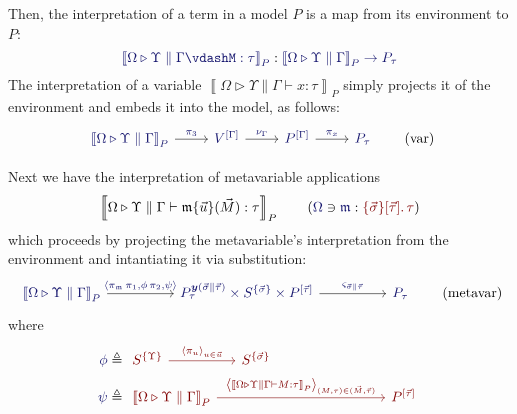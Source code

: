 \documentclass[11pt]{article}
\theoremstyle{definition}
\theoremstyle{remark}
\numberwithin{equation}{section}
\def\IModeColorName{MidnightBlue}
\def\OModeColorName{Maroon}
\newcommand\IMode[1]{{\color{\IModeColorName}{#1}}}
\newcommand\OMode[1]{{\color{\OModeColorName}{#1}}}
\newcommand\Of[2]{\IMode{#1}: \IMode{#2}}
\newcommand\MkValence[3]{%
  \ifthenelse{\equal{#1}{}}{}{%
    \{#1\}%
  }%
  \ifthenelse{\equal{#2}{}}{}{%
    [#2]%
  }.\, #3%
}
\newcommand\Lookup[3]{\IMode{#1}\ni\IMode{#2}:\OMode{#3}}
\newcommand\Tuple[1]{\left\langle#1 \right\rangle}
\newcommand\MV[1]{\mathfrak{#1}}
\newcommand\MApp[3]{#1\{#2\}(#3)}
\newcommand\ADefine[2]{\IMode{#1}&\triangleq\OMode{#2}}
\newcommand\SemBrackets[1]{\left\llbracket#1\right\rrbracket}
\newcommand\Yoneda[1]{\boldsymbol{y} (#1)}
\begin{document}
Then, the interpretation of a term in a model $P$ is a map from its environment
to $P$:
\[%
  \Of{\SemBrackets{\Omega\triangleright\Upsilon\parallel\Gamma\vdash%
      M:\tau}_P}{\SemBrackets{\Omega\triangleright\Upsilon\parallel\Gamma}_P\to P_\tau}%
\]%
The interpretation of a variable
$\SemBrackets{\Omega\triangleright\Upsilon\parallel\Gamma\vdash x:\tau}_P$ simply
projects it of the environment and embeds it into the model, as follows:
\[
  \begin{tikzcd}[ampersand replacement = \&]
    {\IMode{\SemBrackets{\Omega\triangleright\Upsilon\parallel\Gamma}_P}} \arrow[r, "\IMode{\pi_3}"]
    \& {\IMode{V^{[\Gamma]}}} \arrow[r, "\IMode{\nu_{\Gamma}}"]
    \& {\IMode{P^{[\Gamma]}}} \arrow[r, "\IMode{\pi_x}"]
    \& \IMode{P_\tau}
  \end{tikzcd}
  \tag{var}
\]

Next we have the interpretation of metavariable applications
\[%
  \SemBrackets{\Omega\triangleright\Upsilon\parallel\Gamma\vdash%
    \MApp{\MV{m}}{\vec{u}}{\vec{M}} : \tau}_P%
  \qquad(\Lookup{\Omega}{\MV{m}}{\MkValence{\vec{\sigma}}{\vec{\tau}}{\tau}})
\]
which proceeds by projecting the metavariable's interpretation from the
environment and intantiating it via substitution:
\[
  \begin{tikzcd}[ampersand replacement = \&, sep=huge]
    {\IMode{\SemBrackets{\Omega\triangleright\Upsilon\parallel\Gamma}_P}}
          \arrow[r, "\IMode{\Tuple{\pi_\MV{m}\,\pi_1, \phi\,\pi_2, \psi}}"]
    \& {\IMode{P_{\tau}^{\Yoneda{\vec{\sigma}\parallel\vec{\tau}}}\times S^{\{\vec{\sigma}\}} \times P^{[\vec{\tau}]}}}
          \arrow[r, "\IMode{\varsigma_{\vec{\sigma}\parallel\vec{\tau}}}"]
    \& \IMode{P_\tau}
  \end{tikzcd}
  \tag{metavar}
\]
where
\begin{align*}
  \ADefine{\phi}{
  \begin{tikzcd}[ampersand replacement = \&, sep=huge]
    {S^{\{\Upsilon\}}} \arrow[r, "\Tuple{\pi_u}_{u\in\vec{u}}"]
    \& {S^{\{\vec{\sigma}\}}}
  \end{tikzcd}
  }\\
  \ADefine{\psi}{
   \begin{tikzcd}[ampersand replacement = \&, sep=28ex]
     {\SemBrackets{\Omega\triangleright\Upsilon\parallel\Gamma}_P}
     \arrow[r, "\Tuple{\SemBrackets{\Omega\triangleright\Upsilon\parallel\Gamma\vdash M:\tau}_P}_{(M,\tau)\in (\vec{M},\vec{\tau})}"]
     \& {P^{[\vec{\tau}]}}
   \end{tikzcd}
  }
\end{align*}
\end{document}
